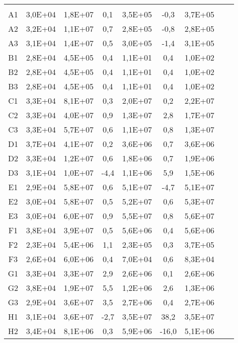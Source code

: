 \begin{center}
\begin{longtable}{ccccccccc}
\toprule
\endhead
\midrule \\ %
\endfoot
\bottomrule 
\endlastfoot
A1    & 3,0E+04 & 1,8E+07 & 0,1   & 3,5E+05 & -0,3  & 3,7E+05 \\
A2    & 3,2E+04 & 1,1E+07 & 0,7   & 2,8E+05 & -0,8  & 2,8E+05 \\
A3    & 3,1E+04 & 1,4E+07 & 0,5   & 3,0E+05 & -1,4  & 3,1E+05 \\
B1    & 2,8E+04 & 4,5E+05 & 0,4   & 1,1E+01 & 0,4   & 1,0E+02 \\
B2    & 2,8E+04 & 4,5E+05 & 0,4   & 1,1E+01 & 0,4   & 1,0E+02 \\
B3    & 2,8E+04 & 4,5E+05 & 0,4   & 1,1E+01 & 0,4   & 1,0E+02 \\
C1    & 3,3E+04 & 8,1E+07 & 0,3   & 2,0E+07 & 0,2   & 2,2E+07 \\
C2    & 3,3E+04 & 4,0E+07 & 0,9   & 1,3E+07 & 2,8   & 1,7E+07 \\
C3    & 3,3E+04 & 5,7E+07 & 0,6   & 1,1E+07 & 0,8   & 1,3E+07 \\
D1    & 3,7E+04 & 4,1E+07 & 0,2   & 3,6E+06 & 0,7   & 3,6E+06 \\
D2    & 3,3E+04 & 1,2E+07 & 0,6   & 1,8E+06 & 0,7   & 1,9E+06 \\
D3    & 3,1E+04 & 1,0E+07 & -4,4  & 1,1E+06 & 5,9   & 1,5E+06 \\
E1    & 2,9E+04 & 5,8E+07 & 0,6   & 5,1E+07 & -4,7  & 5,1E+07 \\
E2    & 3,0E+04 & 5,8E+07 & 0,5   & 5,2E+07 & 0,6   & 5,3E+07 \\
E3    & 3,0E+04 & 6,0E+07 & 0,9   & 5,5E+07 & 0,8   & 5,6E+07 \\
F1    & 3,8E+04 & 3,9E+07 & 0,5   & 5,6E+06 & 0,4   & 5,6E+06 \\
F2    & 2,3E+04 & 5,4E+06 & 1,1   & 2,3E+05 & 0,3   & 3,7E+05 \\
F3    & 2,6E+04 & 6,0E+06 & 0,4   & 7,0E+04 & 0,6   & 8,3E+04 \\
G1    & 3,3E+04 & 3,3E+07 & 2,9   & 2,6E+06 & 0,1   & 2,6E+06 \\
G2    & 3,8E+04 & 1,9E+07 & 5,5   & 1,2E+06 & 2,6   & 1,3E+06 \\
G3    & 2,9E+04 & 3,6E+07 & 3,5   & 2,7E+06 & 0,4   & 2,7E+06 \\
H1    & 3,1E+04 & 3,6E+07 & -2,7  & 3,5E+07 & 38,2  & 3,5E+07 \\
H2    & 3,4E+04 & 8,1E+06 & 0,3   & 5,9E+06 & -16,0 & 5,1E+06 \\

\end{longtable}
\end{center}
